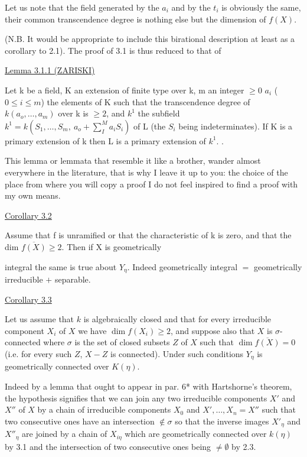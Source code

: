 \documentclass[11pt]{article}
\newcommand{\scanpage}[1]{\par\bigskip\noindent{\small\sffamily[scan #1]}\par}
\newcommand{\mspage}[1]{{\small\sffamily[p.\,#1]}}
\newcommand{\uline}[1]{\underline{#1}}
\begin{document}
Let us note that the field generated by the $a_i$ and by the $t_i$
is obviously the same, their common transcendence degree is
nothing else but the dimension of $f(X)$.

(N.B. It would be appropriate to include this birational
description at least as a corollary to 2.1).  The proof of 3.1 is
thus reduced to that of

\uline{Lemma 3.1.1 (ZARISKI)}

Let k be a field, K an extension of finite type over k, m an
integer $\geq 0$ $a_i$ ($0 \leq i \leq m$) the elements of K such that the
transcendence degree of $k(a_o,\ldots,a_m)$ over k is $\geq 2$, and $k^1$ the
subfield $k^1 = k(S_1,\ldots,S_m,\ a_o + \sum_{I}^{M} a_iS_i)$ of L (the $S_i$ being
indeterminates).  If K is a primary extension of k then L is a
primary extension of $k^1$.   .

This lemma or lemmata that resemble it like a brother, wander
almost everywhere in the literature, that is why I leave it up to
you:  the choice of the place from where you will copy a proof I
do not feel inspired to find a proof with my own means.

\uline{Corollary 3.2}

Assume that f is unramified or that the characteristic of k
is zero, and that the dim $\overline{f(X)} \geq 2$. Then if X is geometrically

\clearpage
\scanpage{24/21}
\mspage{21}

integral the same is true about $Y_\eta$.  Indeed geometrically integral
$=$ geometrically irreducible $+$ separable.

\uline{Corollary 3.3}

Let us assume that $k$ is algebraically closed and that for
every irreducible component $X_i$ of $X$ we have $\dim f(X_i) \geq 2$, and
suppose also that $X$ is $\sigma$-connected where $\sigma$ is the set of closed
subsets $Z$ of $X$ such that $\dim \overline{f(X)} = 0$ (i.e. for every such $Z$,
$X - Z$ is connected).  Under such conditions $Y_\eta$ is geometrically
connected over $K(\eta)$.

Indeed by a lemma that ought to appear in par. 6* with
Hartshorne's theorem, the hypothesis signifies that we can join
any two irreducible components $X'$ and $X''$ of $X$ by a chain of
irreducible components $X_0$ and $X',\ldots,X_n = X''$ such that two
consecutive ones have an intersection $\notin \sigma$ so that the inverse
images $X'_\eta$ and $X''_\eta$ are joined by a chain of $X_{i\eta}$ which are
geometrically connected over $k(\eta)$ by 3.1 and the intersection of
two consecutive ones being $\neq \emptyset$ by 2.3.
\end{document}
